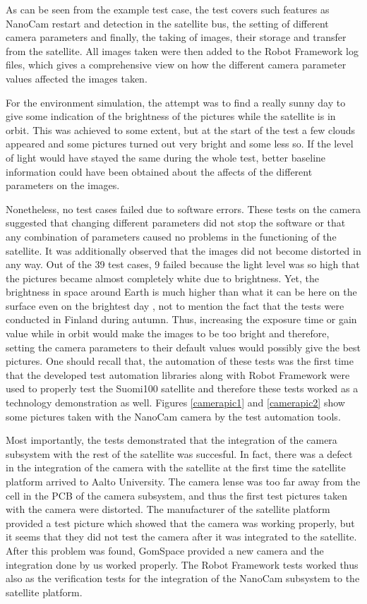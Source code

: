 \documentclass[english,12pt,a4paper,pdftex,elec,utf8]{aaltothesis}
\begin{document}
As can be seen from the example test case, the test covers such features as NanoCam restart and detection in the satellite bus, the setting of different camera parameters and finally, the taking of images, their storage and transfer from the satellite. All images taken were then added to the Robot Framework log files, which gives a comprehensive view on how the different camera parameter values affected the images taken.\par 
For the environment simulation, the attempt was to find a really sunny day to give some indication of the brightness of the pictures while the satellite is in orbit. This was achieved to some extent, but at the start of the test a few clouds appeared and some pictures turned out very bright and some less so. If the level of light would have stayed the same during the whole test, better baseline information could have been obtained about the affects of the different parameters on the images.\par
Nonetheless, no test cases failed due to software errors. These tests on the camera suggested that changing different parameters did not stop the software or that any combination of parameters caused no problems in the functioning of the satellite. It was additionally observed that the images did not become distorted in any way. Out of the 39 test cases, 9 failed because the light level was so high that the pictures became almost completely white due to brightness. Yet, the brightness in space around Earth is much higher than what it can be here on the surface even on the brightest day \cite{solarradiation}, not to mention the fact that the tests were conducted in Finland during autumn. Thus, increasing the exposure time or gain value while in orbit would make the images to be too bright and therefore, setting the camera parameters to their default values would possibly give the best pictures. One should recall that, the automation of these tests was the first time that the developed test automation libraries along with Robot Framework were used to properly test the Suomi100 satellite and therefore these tests worked as a technology demonstration as well. Figures \ref{camerapic1} and \ref{camerapic2} show some pictures taken with the NanoCam camera by the test automation tools. \par
Most importantly, the tests demonstrated that the integration of the camera subsystem with the rest of the satellite was succesful. In fact, there was a defect in the integration of the camera with the satellite at the first time the satellite platform arrived to Aalto University. The camera lense was too far away from the cell in the PCB of the camera subsystem, and thus the first test pictures taken with the camera were distorted. The manufacturer of the satellite platform provided a test picture which showed that the camera was working properly, but it seems that they did not test the camera after it was integrated to the satellite. After this problem was found, GomSpace provided a new camera and the integration done by us worked properly. The Robot Framework tests worked thus also as the verification tests for the integration of the NanoCam subsystem to the satellite platform.\par 
\end{document}
